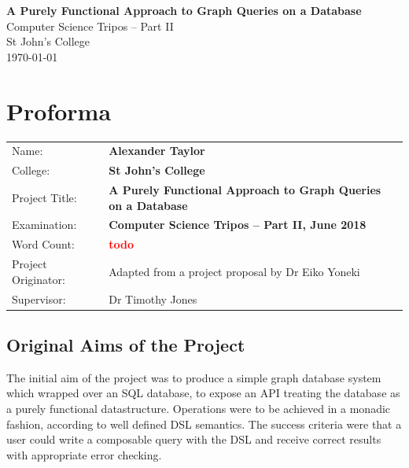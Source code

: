 \documentclass[12pt,a4paper,twoside,openright]{report}
\newcommand\todo[1]{\textcolor{red}{#1}}
\newcommand{\projectTitle}[0]{A Purely Functional Approach to Graph Queries on a Database}
\begin{document}


\pagestyle{empty}


\vspace*{60mm}
\begin{center}
\Huge
\textbf{\projectTitle} \\[5mm]
Computer Science Tripos -- Part II \\[5mm]
St John's College \\[5mm]
\today  %
\end{center}


\pagestyle{plain}

\chapter*{Proforma}

{\large
\begin{tabular}{p{5cm}p{10cm}}
Name:               & \bf Alexander Taylor                       \\
College:            & \bf St John's College                     \\
Project Title:      & \bf \projectTitle  \\
Examination:        & \bf Computer Science Tripos -- Part II, June 2018  \\
Word Count:         & \bf \todo{todo}   \\
Project Originator: & Adapted from a project proposal by Dr Eiko Yoneki                    \\
Supervisor:         & Dr Timothy Jones                    \\ 
\end{tabular}
}

\section*{Original Aims of the Project}

The initial aim of the project was to produce a simple graph database system which wrapped over an SQL database, to expose an API treating the database as a purely functional datastructure. Operations were to be achieved in a monadic fashion, according to well defined DSL semantics. The success criteria were that a user could write a composable query with the DSL and receive correct results with appropriate error checking.
\end{document}
